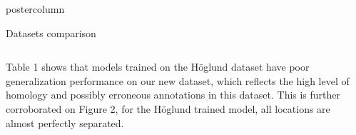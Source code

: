 ﻿\documentclass[final,hyperref={pdfpagelabels=false}]{beamer}
\begin{document}
\begin{frame}
\begin{columns}
\begin{column}{.49\paperwidth}
\begin{beamercolorbox}[center,wd=\textwidth]{postercolumn}
\begin{minipage}[T]{.99\textwidth}
{

\vfill

 \begin{block}{Datasets comparison}
 \begin{columns}
 \begin{column}{1\textwidth}



\centering
\begin{minipage}[t]{0.96\textwidth}
			

\hspace{0.5cm} 
\vspace{-1cm}
\begin{columns}
 \begin{column}{0.45\textwidth}
 \justifying
 \small{Table 1 shows that models trained on the Höglund dataset have poor generalization performance on our new dataset, which reflects the high level of homology and possibly erroneous annotations in this dataset. This is further corroborated on Figure 2,  for the Höglund trained model, all locations are almost perfectly separated.}
 \end{column}
 \begin{column}{0.49\textwidth}


\end{column}
\end{columns}
\end{minipage}
\end{column}
\end{columns}
\end{block}}
\end{minipage}
\end{beamercolorbox}
\end{column}
\end{columns}
\end{frame}
\end{document}

